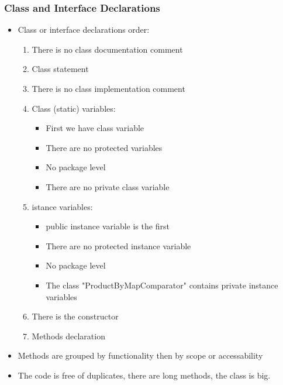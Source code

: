 \subsubsection{Class and Interface Declarations}
\begin{itemize}

\item Class or interface declarations order:
\begin{enumerate}
\item There is no class documentation comment
\item Class statement
\item There is no class implementation comment
\item Class (static) variables:
\begin{itemize}
\item First we have class variable
\item There are no protected variables
\item No package level
\item There are no private class variable
\end{itemize}
\item istance variables:
\begin{itemize}
\item public instance variable is the first
\item There are no protected instance variable
\item No package level
\item The class "ProductByMapComparator" contains private instance variables
\end{itemize}
\item There is the constructor
\item Methods declaration
\end{enumerate}
\item Methods are grouped by functionality then by scope or accessability
\item The code is free of duplicates, there are long methods, the class is big.
\end{itemize}

